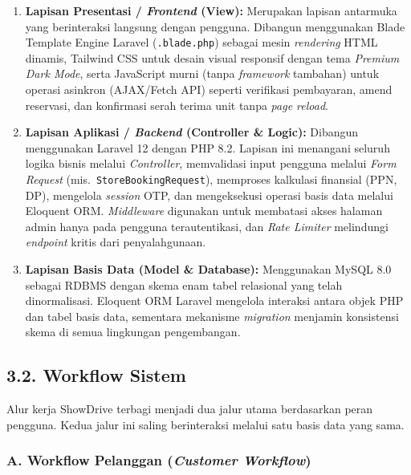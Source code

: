 \documentclass[11pt, a5paper]{article}
\begin{document}
\begin{enumerate}[label=\arabic*.]
  \item \textbf{Lapisan Presentasi / \textit{Frontend} (View):} Merupakan lapisan
        antarmuka yang berinteraksi langsung dengan pengguna. Dibangun menggunakan
        Blade Template Engine Laravel (\texttt{.blade.php}) sebagai mesin
        \textit{rendering} HTML dinamis, Tailwind CSS untuk desain visual responsif
        dengan tema \textit{Premium Dark Mode}, serta JavaScript murni (tanpa
        \textit{framework} tambahan) untuk operasi asinkron (AJAX/Fetch API) seperti
        verifikasi pembayaran, amend reservasi, dan konfirmasi serah terima unit
        tanpa \textit{page reload}.

  \item \textbf{Lapisan Aplikasi / \textit{Backend} (Controller \& Logic):}
        Dibangun menggunakan Laravel 12 dengan PHP 8.2. Lapisan ini menangani
        seluruh logika bisnis melalui \textit{Controller}, memvalidasi input
        pengguna melalui \textit{Form Request} (mis.\ \texttt{StoreBookingRequest}),
        memproses kalkulasi finansial (PPN, DP), mengelola \textit{session} OTP,
        dan mengeksekusi operasi basis data melalui Eloquent ORM. \textit{Middleware}
        digunakan untuk membatasi akses halaman admin hanya pada pengguna
        terautentikasi, dan \textit{Rate Limiter} melindungi \textit{endpoint}
        kritis dari penyalahgunaan.

  \item \textbf{Lapisan Basis Data (Model \& Database):} Menggunakan MySQL 8.0
        sebagai RDBMS dengan skema enam tabel relasional yang telah dinormalisasi.
        Eloquent ORM Laravel mengelola interaksi antara objek PHP dan tabel basis
        data, sementara mekanisme \textit{migration} menjamin konsistensi skema
        di semua lingkungan pengembangan.
\end{enumerate}

\subsection*{3.2. Workflow Sistem}

Alur kerja ShowDrive terbagi menjadi dua jalur utama berdasarkan peran pengguna.
Kedua jalur ini saling berinteraksi melalui satu basis data yang sama.

\subsubsection*{A. Workflow Pelanggan (\textit{Customer Workflow})}
\end{document}
